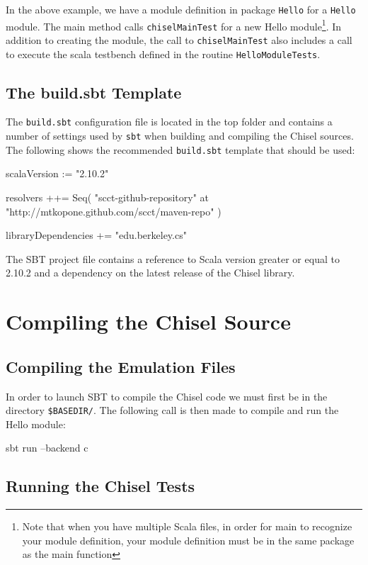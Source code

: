 In the above example, we have a module definition in package \verb+Hello+ for a \verb+Hello+ module. The main method calls \verb+chiselMainTest+ for a new Hello module\footnote{Note that when you have multiple Scala files, in order for main to recognize your module definition, your module definition must be in the same package as the main function}. In addition to creating the module, the call to \verb+chiselMainTest+ also includes a call to execute the scala testbench defined in the routine \verb+HelloModuleTests+.

\subsection{The build.sbt Template}

The \verb+build.sbt+ configuration file is located in the top folder and contains a number of settings used by \verb+sbt+ when building and compiling the Chisel sources.  The following shows the recommended \verb+build.sbt+ template that should be used:

\begin{scala}
scalaVersion := "2.10.2"

resolvers ++= Seq(
  "scct-github-repository" at "http://mtkopone.github.com/scct/maven-repo"
)

libraryDependencies += 
  "edu.berkeley.cs" %
\end{scala}

The SBT project file contains a reference to Scala version greater or equal to 2.10.2 and a dependency on the latest release of the Chisel library.

\section{Compiling the Chisel Source}

\subsection{Compiling the Emulation Files}

In order to launch SBT to compile the Chisel code we must first be in the directory \verb+$BASEDIR/+. The following call is then made to compile and run the Hello module:

\begin{bash}
sbt run --backend c
\end{bash}

\subsection{Running the Chisel Tests}

